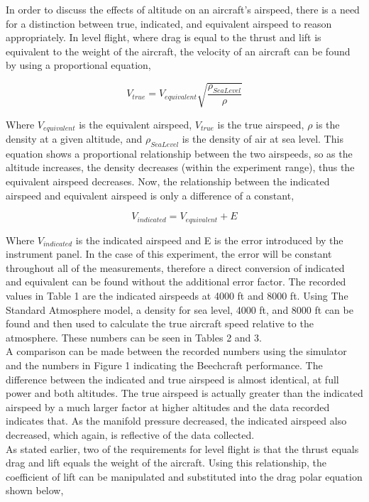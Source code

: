 \documentclass[letterpaper,11pt]{texMemo}
\begin{document}
\maketitle
\doublespacing
In order to discuss the effects of altitude on an aircraft's airspeed, there is a need for a distinction between true, indicated, and equivalent airspeed to reason appropriately. In level flight, where drag is equal to the thrust and lift is equivalent to the weight of the aircraft, the velocity of an aircraft can be found by using a proportional equation,

\begin{equation}
	V_{true} = V_{equivalent} \sqrt{\frac{\rho_{Sea Level}}{\rho}}
	\label{equation:equivAirspeed}
\end{equation}

Where \(V_{equivalent}\) is the equivalent airspeed, \(V_{true}\) is the true airspeed, \(\rho\) is the density at a given altitude, and \(\rho_{Sea Level}\) is the density of air at sea level. This equation shows a proportional relationship between the two airspeeds, so as the altitude increases, the density decreases (within the experiment range), thus the equivalent airspeed decreases. Now, the relationship between the indicated airspeed and equivalent airspeed is only a difference of a constant,

\begin{equation}
    V_{indicated} = V_{equivalent} + E
	\label{equation:indiAirspeed}
\end{equation}

Where \(V_{indicated}\) is the indicated airspeed and E is the error introduced by the instrument panel. In the case of this experiment, the error will be constant throughout all of the measurements, therefore a direct conversion of indicated and equivalent can be found without the additional error factor. The recorded values in Table 1 are the indicated airspeeds at 4000 ft and 8000 ft. Using The Standard Atmosphere model, a density for sea level, 4000 ft, and 8000 ft can be found and then used to calculate the true aircraft speed relative to the atmosphere. These numbers can be seen in Tables 2 and 3. 
\\
A comparison can be made between the recorded numbers using the simulator and the numbers in Figure 1 indicating the Beechcraft performance. The difference between the indicated and true airspeed is almost identical, at full power and both altitudes. The true airspeed is actually greater than the indicated airspeed by a much larger factor at higher altitudes and the data recorded indicates that. As the manifold pressure decreased, the indicated airspeed also decreased, which again, is reflective of the data collected.
\\
As stated earlier, two of the requirements for level flight is that the thrust equals drag and lift equals the weight of the aircraft. Using this relationship, the coefficient of lift can be manipulated and substituted into the drag polar equation shown below,
\end{document}
